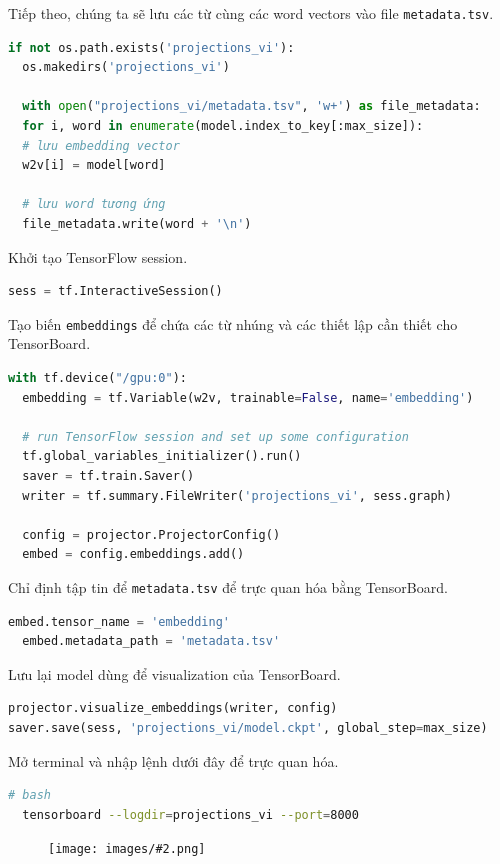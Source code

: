 \documentclass[12pt]{article}
\newcommand{\includeImage}[3]{
\begin{figure}[H]
  \centering
  \texttt{[image: images/\#2.png]}
  \def\temp{#3}\ifx\temp\empty\else\caption{#3}\fi
\end{figure}}
\begin{document}
\vskip 0.5cm
\indent Tiếp theo, chúng ta sẽ lưu các từ cùng các word vectors vào file \texttt{metadata.tsv}.
\begin{lstlisting}[language=python]
  if not os.path.exists('projections_vi'):
  os.makedirs('projections_vi')
  
  with open("projections_vi/metadata.tsv", 'w+') as file_metadata:    
  for i, word in enumerate(model.index_to_key[:max_size]):
  # lưu embedding vector
  w2v[i] = model[word]
  
  # lưu word tương ứng 
  file_metadata.write(word + '\n')
\end{lstlisting}


\vskip 0.5cm
\indent Khởi tạo TensorFlow session.
\begin{lstlisting}[language=python]
sess = tf.InteractiveSession()
\end{lstlisting}

\vskip 0.5cm
\indent Tạo biến \texttt{embeddings} để chứa các từ nhúng và các thiết lập cần thiết cho TensorBoard.
\begin{lstlisting}[language=python]
  with tf.device("/gpu:0"):
  embedding = tf.Variable(w2v, trainable=False, name='embedding')
  
  # run TensorFlow session and set up some configuration
  tf.global_variables_initializer().run()
  saver = tf.train.Saver()
  writer = tf.summary.FileWriter('projections_vi', sess.graph)
  
  config = projector.ProjectorConfig()
  embed = config.embeddings.add()
\end{lstlisting}

\vskip 0.5cm
\indent Chỉ định tập tin để \texttt{metadata.tsv} để trực quan hóa bằng TensorBoard.
\begin{lstlisting}[language=python]
  embed.tensor_name = 'embedding'
  embed.metadata_path = 'metadata.tsv'
\end{lstlisting}

\vskip 0.5cm
\indent Lưu lại model dùng để visualization của TensorBoard.
\begin{lstlisting}[language=python]
projector.visualize_embeddings(writer, config)
saver.save(sess, 'projections_vi/model.ckpt', global_step=max_size)
\end{lstlisting}

\vskip 0.5cm
\indent Mở terminal và nhập lệnh dưới đây để trực quan hóa.
\begin{lstlisting}[language=bash]
  # bash
  tensorboard --logdir=projections_vi --port=8000
\end{lstlisting}
\includeImage{1}{28}{}
\end{document}
